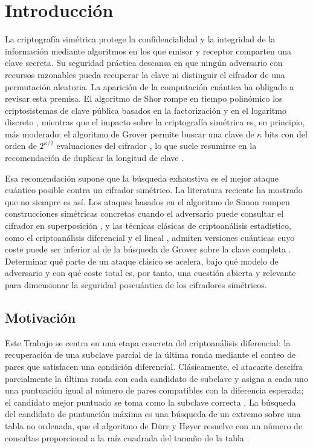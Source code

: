 \chapter{Introducción}

La criptografía simétrica protege la confidencialidad y la integridad de la información mediante algoritmos en los que emisor y receptor comparten una clave secreta. Su seguridad práctica descansa en que ningún adversario con recursos razonables pueda recuperar la clave ni distinguir el cifrador de una permutación aleatoria. La aparición de la computación cuántica ha obligado a revisar esta premisa. El algoritmo de Shor rompe en tiempo polinómico los criptosistemas de clave pública basados en la factorización y en el logaritmo discreto \citep{shor1997}, mientras que el impacto sobre la criptografía simétrica es, en principio, más moderado: el algoritmo de Grover permite buscar una clave de \(\kappa\) bits con del orden de \(2^{\kappa/2}\) evaluaciones del cifrador \citep{grover1996}, lo que suele resumirse en la recomendación de duplicar la longitud de clave \citep{bernstein2017,nist2016}.

Esa recomendación supone que la búsqueda exhaustiva es el mejor ataque cuántico posible contra un cifrador simétrico. La literatura reciente ha mostrado que no siempre es así. Los ataques basados en el algoritmo de Simon rompen construcciones simétricas concretas cuando el adversario puede consultar el cifrador en superposición \citep{kuwakado2010,kaplan2016simon}, y las técnicas clásicas de criptoanálisis estadístico, como el criptoanálisis diferencial \citep{biham1991} y el lineal \citep{matsui1994}, admiten versiones cuánticas cuyo coste puede ser inferior al de la búsqueda de Grover sobre la clave completa \citep{kaplan2016diff,zhou2019}. Determinar qué parte de un ataque clásico se acelera, bajo qué modelo de adversario y con qué coste total es, por tanto, una cuestión abierta y relevante para dimensionar la seguridad poscuántica de los cifradores simétricos.

\section{Motivación}

Este Trabajo se centra en una etapa concreta del criptoanálisis diferencial: la recuperación de una subclave parcial de la última ronda mediante el conteo de pares que satisfacen una condición diferencial. Clásicamente, el atacante descifra parcialmente la última ronda con cada candidato de subclave y asigna a cada uno una puntuación igual al número de pares compatibles con la diferencia esperada; el candidato mejor puntuado se toma como la subclave correcta \citep{biham1991,heys2002}. La búsqueda del candidato de puntuación máxima es una búsqueda de un extremo sobre una tabla no ordenada, que el algoritmo de Dürr y Høyer resuelve con un número de consultas proporcional a la raíz cuadrada del tamaño de la tabla \citep{durr1996}.


